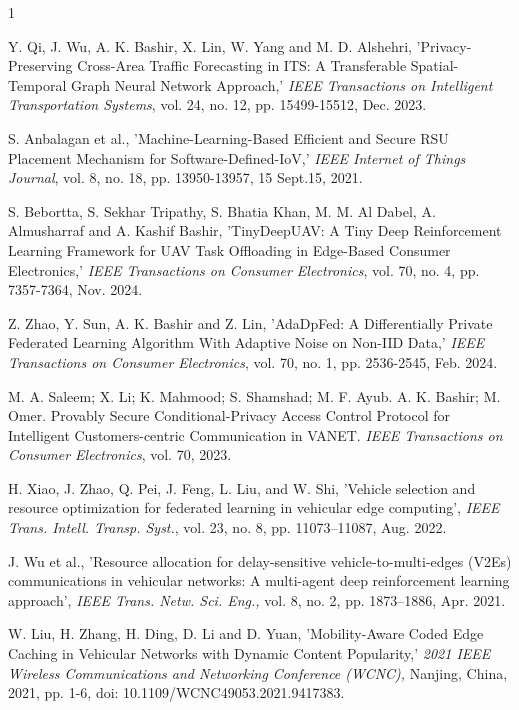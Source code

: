 \documentclass[journal]{IEEEtran}
\begin{document}
\begin{thebibliography}{1}


 Y. Qi, J. Wu, A. K. Bashir, X. Lin, W. Yang and M. D. Alshehri, 'Privacy-Preserving Cross-Area Traffic Forecasting in ITS: A Transferable Spatial-Temporal Graph Neural Network Approach,' \textit{IEEE Transactions on Intelligent Transportation Systems}, vol. 24, no. 12, pp. 15499-15512, Dec. 2023.

 S. Anbalagan et al., 'Machine-Learning-Based Efficient and Secure RSU Placement Mechanism for Software-Defined-IoV,' \textit{IEEE Internet of Things Journal}, vol. 8, no. 18, pp. 13950-13957, 15 Sept.15, 2021.

 S. Bebortta, S. Sekhar Tripathy, S. Bhatia Khan, M. M. Al Dabel, A. Almusharraf and A. Kashif Bashir, 'TinyDeepUAV: A Tiny Deep Reinforcement Learning Framework for UAV Task Offloading in Edge-Based Consumer Electronics,'  \textit{IEEE Transactions on Consumer Electronics}, vol. 70, no. 4, pp. 7357-7364, Nov. 2024.

 Z. Zhao, Y. Sun, A. K. Bashir and Z. Lin, 'AdaDpFed: A Differentially Private Federated Learning Algorithm With Adaptive Noise on Non-IID Data,' \textit{IEEE Transactions on Consumer Electronics}, vol. 70, no. 1, pp. 2536-2545, Feb. 2024.

M. A. Saleem; X. Li; K. Mahmood; S. Shamshad; M. F. Ayub. A. K. Bashir; M. Omer. Provably Secure Conditional-Privacy Access Control Protocol for Intelligent Customers-centric Communication in VANET. \textit{IEEE Transactions on Consumer Electronics}, vol. 70, 2023.

 
 H. Xiao, J. Zhao, Q. Pei, J. Feng, L. Liu, and W. Shi, 'Vehicle selection and resource optimization for federated learning in vehicular edge computing', \textit{IEEE Trans. Intell. Transp. Syst.}, vol. 23, no. 8, pp. 11073–11087, Aug. 2022. 

 J. Wu et al., 'Resource allocation for delay-sensitive vehicle-to-multi-edges (V2Es) communications in vehicular networks: A multi-agent deep reinforcement learning approach', \textit{IEEE Trans. Netw. Sci. Eng.,} vol. 8, no. 2, pp. 1873–1886, Apr. 2021.

 W. Liu, H. Zhang, H. Ding, D. Li and D. Yuan, 'Mobility-Aware Coded Edge Caching in Vehicular Networks with Dynamic Content Popularity,' \textit{2021 IEEE Wireless Communications and Networking Conference (WCNC),} Nanjing, China, 2021, pp. 1-6, doi: 10.1109/WCNC49053.2021.9417383.


\end{thebibliography}
\end{document}
